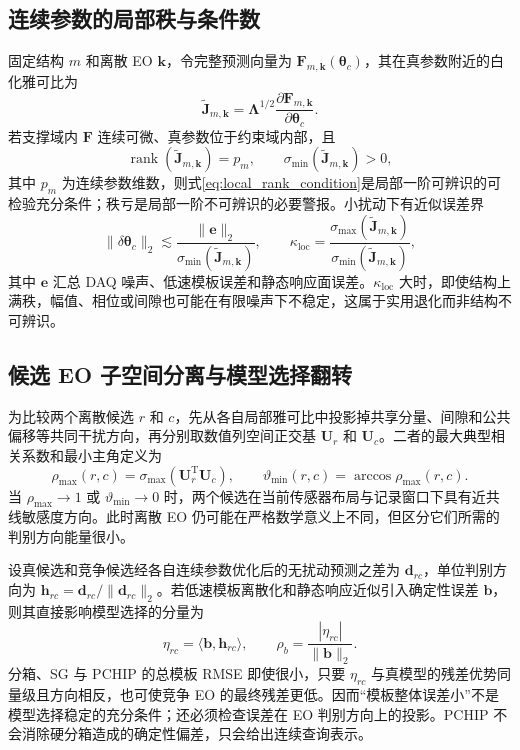 \documentclass[UTF8,12pt,a4paper]{ctexart}
\begin{document}
\subsection{连续参数的局部秩与条件数}

固定结构 $m$ 和离散 EO $\bm k$，令完整预测向量为 $\bm F_{m,\bm k}(\bm\theta_c)$，其在真参数附近的白化雅可比为
\begin{equation}
\widetilde{\bm J}_{m,\bm k}
=\bm\Lambda^{1/2}
\frac{\partial\bm F_{m,\bm k}}{\partial\bm\theta_c}.
\label{eq:full_jacobian}
\end{equation}
若支撑域内 $\bm F$ 连续可微、真参数位于约束域内部，且
\begin{equation}
\operatorname{rank}(\widetilde{\bm J}_{m,\bm k})
=p_m,
\qquad
\sigma_{\min}(\widetilde{\bm J}_{m,\bm k})>0,
\label{eq:local_rank_condition}
\end{equation}
其中 $p_m$ 为连续参数维数，则式\eqref{eq:local_rank_condition}是局部一阶可辨识的可检验充分条件；秩亏是局部一阶不可辨识的必要警报。小扰动下有近似误差界
\begin{equation}
\|\delta\bm\theta_c\|_2
\lesssim
\frac{\|\bm e\|_2}{\sigma_{\min}(\widetilde{\bm J}_{m,\bm k})},
\qquad
\kappa_{\mathrm{loc}}
=\frac{\sigma_{\max}(\widetilde{\bm J}_{m,\bm k})}
{\sigma_{\min}(\widetilde{\bm J}_{m,\bm k})},
\label{eq:local_condition_bound}
\end{equation}
其中 $\bm e$ 汇总 DAQ 噪声、低速模板误差和静态响应面误差。$\kappa_{\mathrm{loc}}$ 大时，即使结构上满秩，幅值、相位或间隙也可能在有限噪声下不稳定，这属于实用退化而非结构不可辨识。

\subsection{候选 EO 子空间分离与模型选择翻转}

为比较两个离散候选 $r$ 和 $c$，先从各自局部雅可比中投影掉共享分量、间隙和公共偏移等共同干扰方向，再分别取数值列空间正交基 $\bm U_r$ 和 $\bm U_c$。二者的最大典型相关系数和最小主角定义为
\begin{equation}
\rho_{\max}(r,c)=\sigma_{\max}(\bm U_r^{\mathrm T}\bm U_c),
\qquad
\vartheta_{\min}(r,c)=\arccos\rho_{\max}(r,c).
\label{eq:principal_angle}
\end{equation}
当 $\rho_{\max}\rightarrow1$ 或 $\vartheta_{\min}\rightarrow0$ 时，两个候选在当前传感器布局与记录窗口下具有近共线敏感度方向。此时离散 EO 仍可能在严格数学意义上不同，但区分它们所需的判别方向能量很小。

设真候选和竞争候选经各自连续参数优化后的无扰动预测之差为 $\bm d_{rc}$，单位判别方向为 $\bm h_{rc}=\bm d_{rc}/\|\bm d_{rc}\|_2$。若低速模板离散化和静态响应近似引入确定性误差 $\bm b$，则其直接影响模型选择的分量为
\begin{equation}
\eta_{rc}=\langle\bm b,\bm h_{rc}\rangle,
\qquad
\rho_b=\frac{|\eta_{rc}|}{\|\bm b\|_2}.
\label{eq:discriminant_projection}
\end{equation}
分箱、SG 与 PCHIP 的总模板 RMSE 即使很小，只要 $\eta_{rc}$ 与真模型的残差优势同量级且方向相反，也可使竞争 EO 的最终残差更低。因而“模板整体误差小”不是模型选择稳定的充分条件；还必须检查误差在 EO 判别方向上的投影。PCHIP 不会消除硬分箱造成的确定性偏差，只会给出连续查询表示。
\end{document}
